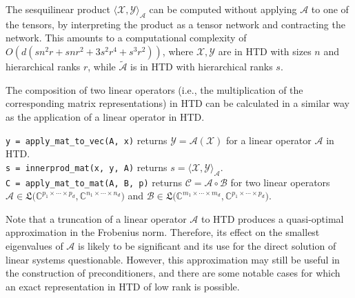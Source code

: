\documentclass[11pt, a4paper]{article}
\newcommand{\calA}{\mathcal{A}}
\newcommand{\calB}{\mathcal{B}}
\newcommand{\calC}{\mathcal{C}}
\newcommand{\calX}{\mathcal{X}}
\newcommand{\calY}{\mathcal{Y}}
\newcommand{\F}{{\mathbb F}}
\newcommand{\C}{{\mathbb C}}
\renewcommand{\tilde}{\widetilde}
\begin{document}
%

%

The sesquilinear product
$\langle \calX, \calY \rangle_\calA$
can be computed without applying $\calA$ to one of the tensors,
by interpreting the product as a tensor network and contracting the network.
This amounts to a computational complexity of
$O(d (s n^2 r + s n r^2 + 3 s^2 r^4 + s^3 r^2))$,
where $\calX, \calY$ are in HTD with sizes $n$ and hierarchical ranks $r$, 
while $\tilde{\calA}$ is in HTD with hierarchical ranks $s$.

%

The composition of two linear operators (i.e., the multiplication of the corresponding matrix representations)
in HTD can be calculated in a similar way as the application of a linear operator in HTD.
%
\begin{framed}\noindent
\texttt{y = apply\_mat\_to\_vec(A, x)} returns $\calY = \calA(\calX)$ for a linear operator $\calA$ in HTD.\\
\texttt{s = innerprod\_mat(x, y, A)} returns $s = \langle \calX, \calY \rangle_\calA$.\\
\texttt{C = apply\_mat\_to\_mat(A, B, p)} returns $\calC = \calA \circ \calB$ for two linear operators
$\calA \in \mathfrak{L}\big(\C^{p_1 \times \cdots \times p_d }, \C^{n_1 \times \cdots \times n_d} \big)$
and $\calB \in \mathfrak{L}\big(\C^{m_1 \times \cdots \times m_d }, \C^{p_1 \times \cdots \times p_d} \big)$.
\end{framed}
%
Note that a truncation of a linear operator $\calA$ to HTD produces a quasi-optimal approximation in the Frobenius norm.
Therefore, its effect on the smallest eigenvalues of $\calA$ is likely to be significant and its use for the direct
solution of linear systems questionable.
%
However, 
this approximation may still be useful
in the construction of preconditioners,
and there are some notable cases
for which an exact representation in HTD of low rank is possible.
\end{document}
